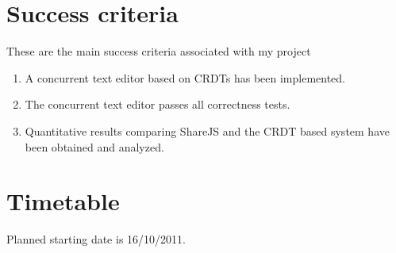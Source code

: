 \documentclass[12pt,a4paper,twoside]{article}
\begin{document}
\section*{Success criteria}

These are the main success criteria associated with my project

\begin{enumerate}
\item A concurrent text editor based on CRDTs has been implemented.

\item The concurrent text editor passes all correctness tests.

\item Quantitative results comparing ShareJS and the CRDT based system have been obtained and analyzed.
\end{enumerate}


\section*{Timetable}

Planned starting date is 16/10/2011.
\end{document}
